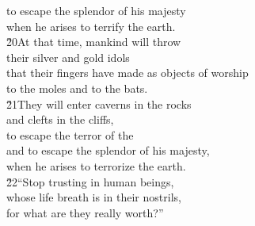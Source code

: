\begin{poetry}
\poemll    to escape the splendor of his majesty \\
\poemlll       when he arises to terrify the earth. \\
\poeml \v{20}At that time, mankind will throw \\
\poemll    their silver and gold idols \\
\poeml that their fingers have made as objects of worship \\
\poemll    to the moles and to the bats. \\
\poeml \v{21}They will enter caverns in the rocks \\
\poemll    and clefts in the cliffs, \\
\poeml to escape the terror of the  \\
\poemll    and to escape the splendor of his majesty, \\
\poemlll       when he arises to terrorize the earth. \\
\poeml \v{22}``Stop trusting in human beings, \\
\poemll    whose life breath is in their nostrils, \\
\poemlll       for what are they really worth?''
\end{poetry}


